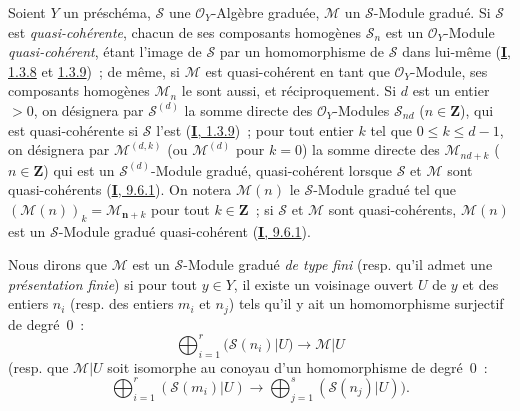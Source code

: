 \begin{env}[3.1.1]
\label{II.3.1.1-fr}
Soient $Y$ un préschéma, $\mathcal{S}$ une $\mathcal{O}_Y$-Algèbre graduée,
$\mathcal{M}$ un $\mathcal{S}$-Module gradué. Si $\mathcal{S}$ est
\emph{quasi-cohérente}, chacun de ses composants homogènes $\mathcal{S}_n$ est
un $\mathcal{O}_Y$-Module \emph{quasi-cohérent}, étant l'image de
$\mathcal{S}$ par un homomorphisme de $\mathcal{S}$ dans lui-même
(\hyperref[I.1.3.8-fr]{\textbf{I}, 1.3.8} et
\hyperref[I.1.3.9-fr]{1.3.9})~; de même, si $\mathcal{M}$ est
quasi-cohérent en tant que $\mathcal{O}_Y$-Module, ses composants homogènes
$\mathcal{M}_n$ le sont aussi, et réciproquement. Si $d$ est un entier $>0$,
on désignera par $\mathcal{S}^{(d)}$ la somme directe des
$\mathcal{O}_Y$-Modules $\mathcal{S}_{nd}$ ($n\in\mathbf{Z}$), qui est
quasi-cohérente si $\mathcal{S}$ l'est
(\hyperref[I.1.3.9-fr]{\textbf{I}, 1.3.9})~; pour tout entier $k$ tel que
$0\leq k\leq d-1$, on désignera par $\mathcal{M}^{(d,k)}$ (ou
$\mathcal{M}^{(d)}$ pour $k=0$) la somme directe des
$\mathcal{M}_{nd+k}$ ($n\in\mathbf{Z}$) qui est un
$\mathcal{S}^{(d)}$-Module gradué, quasi-cohérent lorsque $\mathcal{S}$ et
$\mathcal{M}$ sont quasi-cohérents (\hyperref[I.9.6.1-fr]{\textbf{I}, 9.6.1}). On
notera $\mathcal{M}(n)$ le $\mathcal{S}$-Module gradué tel que
$(\mathcal{M}(n))_k=\mathcal{M}_{\boldsymbol{n}+k}$ pour tout $k\in\mathbf{Z}$~; si
$\mathcal{S}$ et $\mathcal{M}$ sont quasi-cohérents, $\mathcal{M}(n)$ est un
$\mathcal{S}$-Module gradué quasi-cohérent
(\hyperref[I.9.6.1-fr]{\textbf{I}, 9.6.1}).

Nous dirons que $\mathcal{M}$ est un $\mathcal{S}$-Module gradué
\emph{de type fini} (resp. qu'il admet une \emph{présentation finie}) si pour
tout $y\in Y$, il existe un voisinage ouvert $U$ de $y$ et des entiers $n_i$
(resp. des entiers $m_i$ et $n_j$) tels qu'il y ait un homomorphisme surjectif
de degré~$0$~:
\[
  \bigoplus_{i=1}^r(\mathcal{S}(n_i)|U)\longrightarrow\mathcal{M}|U
\]
(resp. que $\mathcal{M}|U$ soit isomorphe au conoyau d'un homomorphisme de
degré~$0$~:
\[
  \bigoplus_{i=1}^r(\mathcal{S}(m_i)|U)
  \longrightarrow\bigoplus_{j=1}^s(\mathcal{S}(n_j)|U)).
\]


\end{env}
